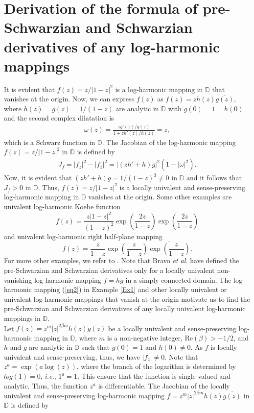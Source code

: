 \documentclass[12pt,reqno]{amsart}
\newtheorem{open problem}{Open problem}[section]
\newcommand{\ol}{\overline}
\newcommand{\beas}{\begin{eqnarray*}}
\newcommand{\eeas}{\end{eqnarray*}}
\numberwithin{equation}{section}
\begin{document}
\section{Derivation of the formula of pre-Schwarzian and Schwarzian derivatives of any log-harmonic mappings}
 It is evident that $f(z)=z/|1-z|^2$ is a log-harmonic mapping in $\mathbb{D}$ that vanishes at the origin. Now, we can express $f(z)$ as $f(z)=zh(z)\ol{g(z)}$, where $h(z)=g(z)=1/(1-z)$ are analytic in $\mathbb{D}$ with $g(0)=1=h(0)$ and the second complex dilatation is 
\beas \omega(z)=\frac{z g'(z)/g(z)}{1+z h'(z)/h(z)}=z,\eeas
which is a Schwarz function in $\mathbb{D}$. The Jacobian of the log-harmonic mapping $f(z)=z/|1-z|^2$ in $\mathbb{D}$ is defined by 
\beas J_f=|f_z|^2-|f_{\ol{z}}|^2=\left|(zh'+h)g\right|^2\left(1-|\omega|^2\right).\eeas
Now, it is evident that $(zh'+h)g=1/(1-z)^3\not=0$ in $\mathbb{D}$ and it follows that $ J_f>0$ in $\mathbb{D}$. Thus, $f(z)=z/|1-z|^2$ is a locally univalent and 
sense-preserving log-harmonic mapping in $\mathbb{D}$ vanishes at the origin. 
Some other examples are univalent log-harmonic Koebe function 
\[f(z)=\frac{z|1-z|^2}{(1-z)^2}\exp\left(\frac{2z}{1-z}\right)\ol{\exp\left(\frac{2z}{1-z}\right)}\] and univalent log-harmonic right half-plane mapping 
\[f(z)=\frac{z}{1-z}\exp\left(\frac{z}{1-z}\right)\ol{\exp\left(\frac{z}{1-z}\right)}.\] 
For more other examples, we refer to \cite{LP2022}. Note that Bravo {\it et al.} \cite{BHPV2022} have defined the pre-Schwarzian and Schwarzian derivatives 
only for a locally univalent non-vanishing log-harmonic mapping $f=h\ol{g}$ in a simply connected domain. 
The log-harmonic mapping (\ref{eq2}) in \textrm{Example \ref{Ex1}} and other locally univalent or univalent log-harmonic mappings that vanish at the origin motivate us to find the 
pre-Schwarzian and Schwarzian derivatives of any locally univalent log-harmonic mappings in $\mathbb{D}$.\\[2mm]
\indent Let $f(z)=z^m|z|^{2\beta m} h(z)\ol{g(z)}$ be a locally univalent and sense-preserving log-harmonic mapping in $\mathbb{D}$, where 
$m$ is a non-negative integer, $\text{Re}(\beta)>-1/2$, and $h$ and $g$ are analytic in $\mathbb{D}$ such that $g(0)=1$ and $h(0)\not=0$. As $f$ is locally univalent and 
sense-preserving, thus, we have $|f_z|\not=0$. Note that $z^a=\exp(a\log(z))$, where the branch of the logarithm is determined by $log(1)=0$, {\it i.e.}, $1^a=1$. This ensure that the function is
 single-valued and analytic. Thus, the function $z^a$ is differentiable.
The Jacobian of the locally univalent and sense-preserving log-harmonic mapping $f=z^m|z|^{2\beta m} h(z)\ol{g(z)}$ in $\mathbb{D}$ is defined by 
\end{document}
